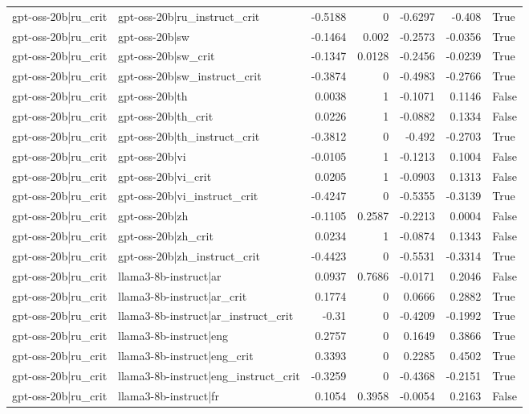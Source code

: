 \begin{table}
\begin{tabular}{l l r r r r l}
gpt-oss-20b|ru_crit & gpt-oss-20b|ru_instruct_crit & -0.5188 & 0 & -0.6297 & -0.408 & True \\
gpt-oss-20b|ru_crit & gpt-oss-20b|sw & -0.1464 & 0.002 & -0.2573 & -0.0356 & True \\
gpt-oss-20b|ru_crit & gpt-oss-20b|sw_crit & -0.1347 & 0.0128 & -0.2456 & -0.0239 & True \\
gpt-oss-20b|ru_crit & gpt-oss-20b|sw_instruct_crit & -0.3874 & 0 & -0.4983 & -0.2766 & True \\
gpt-oss-20b|ru_crit & gpt-oss-20b|th & 0.0038 & 1 & -0.1071 & 0.1146 & False \\
gpt-oss-20b|ru_crit & gpt-oss-20b|th_crit & 0.0226 & 1 & -0.0882 & 0.1334 & False \\
gpt-oss-20b|ru_crit & gpt-oss-20b|th_instruct_crit & -0.3812 & 0 & -0.492 & -0.2703 & True \\
gpt-oss-20b|ru_crit & gpt-oss-20b|vi & -0.0105 & 1 & -0.1213 & 0.1004 & False \\
gpt-oss-20b|ru_crit & gpt-oss-20b|vi_crit & 0.0205 & 1 & -0.0903 & 0.1313 & False \\
gpt-oss-20b|ru_crit & gpt-oss-20b|vi_instruct_crit & -0.4247 & 0 & -0.5355 & -0.3139 & True \\
gpt-oss-20b|ru_crit & gpt-oss-20b|zh & -0.1105 & 0.2587 & -0.2213 & 0.0004 & False \\
gpt-oss-20b|ru_crit & gpt-oss-20b|zh_crit & 0.0234 & 1 & -0.0874 & 0.1343 & False \\
gpt-oss-20b|ru_crit & gpt-oss-20b|zh_instruct_crit & -0.4423 & 0 & -0.5531 & -0.3314 & True \\
gpt-oss-20b|ru_crit & llama3-8b-instruct|ar & 0.0937 & 0.7686 & -0.0171 & 0.2046 & False \\
gpt-oss-20b|ru_crit & llama3-8b-instruct|ar_crit & 0.1774 & 0 & 0.0666 & 0.2882 & True \\
gpt-oss-20b|ru_crit & llama3-8b-instruct|ar_instruct_crit & -0.31 & 0 & -0.4209 & -0.1992 & True \\
gpt-oss-20b|ru_crit & llama3-8b-instruct|eng & 0.2757 & 0 & 0.1649 & 0.3866 & True \\
gpt-oss-20b|ru_crit & llama3-8b-instruct|eng_crit & 0.3393 & 0 & 0.2285 & 0.4502 & True \\
gpt-oss-20b|ru_crit & llama3-8b-instruct|eng_instruct_crit & -0.3259 & 0 & -0.4368 & -0.2151 & True \\
gpt-oss-20b|ru_crit & llama3-8b-instruct|fr & 0.1054 & 0.3958 & -0.0054 & 0.2163 & False \\

\end{tabular}
\end{table}
